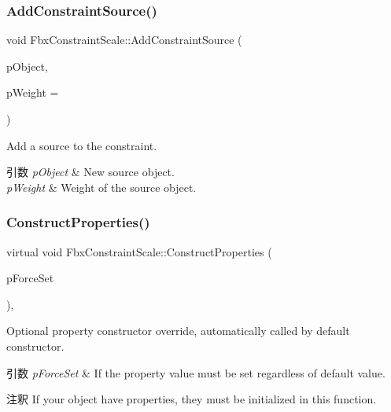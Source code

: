 \subsubsection{\texorpdfstring{Add\+Constraint\+Source()}{AddConstraintSource()}}
{\footnotesize\ttfamily void Fbx\+Constraint\+Scale\+::\+Add\+Constraint\+Source (\begin{DoxyParamCaption}\item[{\hyperlink{class_fbx_object}{Fbx\+Object} $\ast$}]{p\+Object,  }\item[{double}]{p\+Weight = {} }\end{DoxyParamCaption})}

Add a source to the constraint. 
\begin{DoxyParams}{引数}
{\em p\+Object} & New source object. \\
\hline
{\em p\+Weight} & Weight of the source object. \\
\hline
\end{DoxyParams}
\mbox{\label{class_fbx_constraint_scale_af34ea4ce8516d69aefbcb9e83060b2c1}} 
\subsubsection{\texorpdfstring{Construct\+Properties()}{ConstructProperties()}}
{\footnotesize\ttfamily virtual void Fbx\+Constraint\+Scale\+::\+Construct\+Properties (\begin{DoxyParamCaption}\item[{bool}]{p\+Force\+Set }\end{DoxyParamCaption})\hspace{0.3cm}{\ttfamily [protected]}, {\ttfamily [virtual]}}

Optional property constructor override, automatically called by default constructor. 
\begin{DoxyParams}{引数}
{\em p\+Force\+Set} & If the property value must be set regardless of default value. \\
\hline
\end{DoxyParams}
\begin{DoxyRemark}{注釈}
If your object have properties, they must be initialized in this function. 
\end{DoxyRemark}



